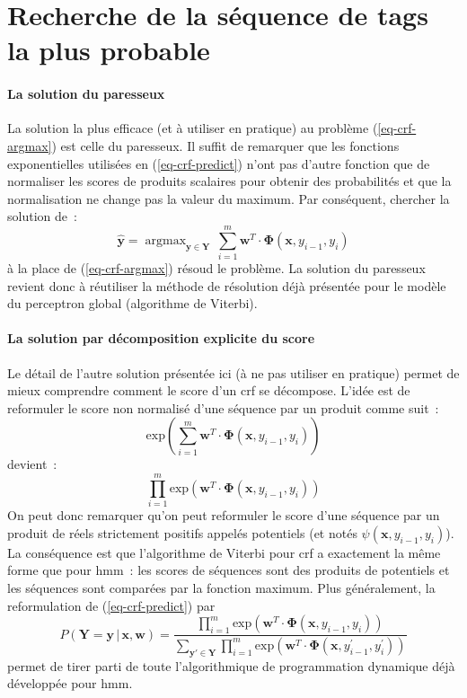\documentclass[11pt,openany]{book}
\newcommand{\ac}[1]{{\sc #1}} %
\begin{document}
\section{Recherche de la séquence de tags la plus probable}

\paragraph{La solution du paresseux}
La solution la plus efficace (et à utiliser en pratique) au problème (\ref{eq-crf-argmax}) est celle du paresseux.  Il suffit de remarquer que les fonctions exponentielles utilisées en (\ref{eq-crf-predict})  n'ont pas d'autre fonction que de normaliser les scores de produits scalaires pour obtenir des probabilités et que la normalisation
ne change pas la valeur du maximum. Par conséquent, chercher la solution de~:
\begin{equation}
\hat{\mathbf{y}} =  \mathop{\text{argmax}}_{\mathbf{y}\in \mathbf{Y}}
\, \sum_{i=1}^m \mathbf{w}^T \cdot \boldsymbol\Phi(\mathbf{x},y_{i-1},y_i)
\end{equation}
à la place de (\ref{eq-crf-argmax}) résoud le problème. La solution du paresseux revient donc à réutiliser la méthode de résolution déjà présentée pour le modèle du perceptron global (algorithme de Viterbi). 

\paragraph{La solution par décomposition explicite du score}
Le détail de l'autre solution présentée ici (à ne pas utiliser en pratique) permet de mieux comprendre comment le score d'un \ac{crf} se décompose.
L'idée est de reformuler le score non normalisé d'une séquence par un produit comme suit~: 
\begin{displaymath}
\text{exp}\left(\sum_{i=1}^m \mathbf{w}^T \cdot \boldsymbol\Phi(\mathbf{x},y_{i-1},y_i)\right)
\end{displaymath}
devient~:
\begin{displaymath}
\prod_{i=1}^m \text{exp}\left(\mathbf{w}^T \cdot \boldsymbol\Phi(\mathbf{x},y_{i-1},y_i)\right)
\end{displaymath}
On peut donc remarquer qu'on peut reformuler le score d'une séquence par un produit de réels strictement positifs appelés potentiels (et notés $\psi(\mathbf{x},y_{i-1},y_i)$). La conséquence est que l'algorithme de Viterbi pour \ac{crf} a exactement la même forme que pour \ac{hmm}~:
les scores de séquences sont des produits de potentiels et les séquences sont comparées par la fonction maximum. Plus généralement, la reformulation de (\ref{eq-crf-predict}) par 
\begin{equation}
P(\mathbf{Y} = \mathbf{y} \,|\, \mathbf{x},\mathbf{w}) = \frac{\prod_{i=1}^m\text{exp}\left( \mathbf{w}^T \cdot \boldsymbol\Phi(\mathbf{x},y_{i-1},y_i)\right)}
{\sum_{\mathbf{y}'\in \mathbf{Y}}
\prod_{i=1}^m \text{exp}\left(\mathbf{w}^T \cdot \boldsymbol\Phi(\mathbf{x},y^{'}_{i-1},y^{'}_i)\right)}
\end{equation}
permet de tirer parti de toute l'algorithmique de programmation dynamique déjà développée pour \ac{hmm}.
\end{document}
